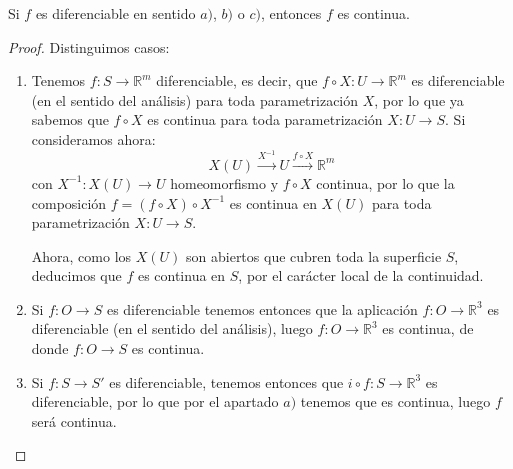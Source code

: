 \begin{prop}
    Si $f$ es diferenciable en sentido $a)$, $b)$ o $c)$, entonces $f$ es continua.
    \begin{proof}
        Distinguimos casos:
        \begin{enumerate}[label=\alph*)]
            \item Tenemos $f:S\to \mathbb{R}^m$ diferenciable, es decir, que $f\circ X:U\to \mathbb{R}^m$ es diferenciable (en el sentido del análisis) para toda parametrización $X$, por lo que ya sabemos que $f\circ X$ es continua para toda parametrización $X:U\to S$. Si consideramos ahora:
                \begin{equation*}
                    X(U) \stackrel{X^{-1}}{\longrightarrow} U \stackrel{f\circ X}{\longrightarrow} \mathbb{R}^m
                \end{equation*}
                con $X^{-1}:X(U)\to U$ homeomorfismo y $f\circ X$ continua, por lo que la composición $f = (f\circ X)\circ X^{-1}$ es continua en $X(U)$ para toda parametrización $X:U\to S$.

                Ahora, como los $X(U)$ son abiertos que cubren toda la superficie $S$, deducimos que $f$ es continua en $S$, por el carácter local de la continuidad.
            \item Si $f:O\to S$ es diferenciable tenemos entonces que la aplicación $f:O\to\mathbb{R}^3$ es diferenciable (en el sentido del análisis), luego $f:O\to \mathbb{R}^3$ es continua, de donde $f:O\to S$ es continua.
            \item Si $f:S\to S'$ es diferenciable, tenemos entonces que $i\circ f:S\to\mathbb{R}^3$  es diferenciable, por lo que por el apartado $a)$ tenemos que es continua, luego $f$ será continua.
        \end{enumerate}
    \end{proof}
\end{prop}

